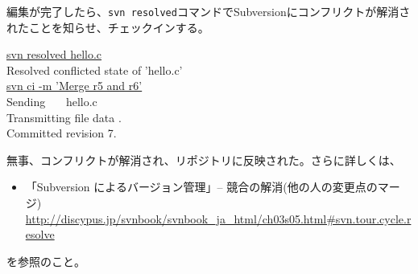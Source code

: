 編集が完了したら、{\tt svn resolved}コマンドでSubversionにコンフリクトが解消されたことを知らせ、チェックインする。
\begin{commandline2}
\prompt \underline{svn resolved hello.c} \\
Resolved conflicted state of 'hello.c' \\
\prompt \underline{svn ci -m 'Merge r5 and r6'} \\
Sending \ \ \ hello.c \\
Transmitting file data . \\
Committed revision 7.
\end{commandline2} \noindent
無事、コンフリクトが解消され、リポジトリに反映された。さらに詳しくは、
\begin{itemize}
  \item 「Subversion によるバージョン管理」-- 競合の解消(他の人の変更点のマージ) \\
    {\footnotesize \url{http://discypus.jp/svnbook/svnbook_ja_html/ch03s05.html#svn.tour.cycle.resolve}}
\end{itemize}
を参照のこと。
  

